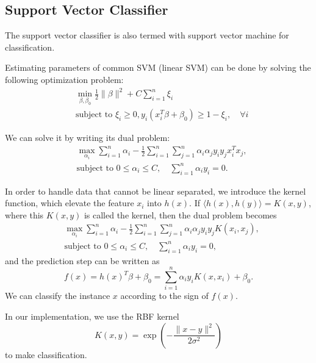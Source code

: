 \documentclass[english]{article}
\begin{document}
\subsection{Support Vector Classifier}
\par The support vector classifier is also termed with support vector machine for classification. 
\par Estimating parameters of common SVM (linear SVM) can be done by solving the following optimization problem:
\begin{equation}
	\begin{aligned}
		& \min_{\beta, \beta_{0}}\frac{1}{2}\|\beta\|^{2} + C\sum_{i=1}^{n}\xi_{i}\\
		& \text{subject to }\xi_{i}\ge 0, y_{i}(x_{i}^{T}\beta + \beta_{0})\ge 1 - \xi_{i}, \quad \forall i
	\end{aligned}
\end{equation}
\par We can solve it by writing its dual problem:
\begin{equation}
	\begin{aligned}
		& \max_{\alpha_{i}}\sum_{i=1}^{n}\alpha_{i} - \frac{1}{2}\sum_{i=1}^{n}\sum_{j=1}^{n}\alpha_{i}\alpha_{j}y_{i}y_{j}x_{i}^{T}x_{j},\\
		& \text{subject to } 0\le \alpha_{i}\le C, \quad\sum_{i=1}^{n}\alpha_{i}y_{i} = 0.
	\end{aligned}
\end{equation}
\par In order to handle data that cannot be linear separated, we introduce the kernel function, which elevate the feature $x_{i}$ into $h(x)$. If $\langle h(x), h(y)\rangle = K(x, y)$, where this $K(x, y)$ is called the kernel, then the dual problem becomes
\begin{equation}
	\begin{aligned}
		& \max_{\alpha_{i}}\sum_{i=1}^{n}\alpha_{i} - \frac{1}{2}\sum_{i=1}^{n}\sum_{j=1}^{n}\alpha_{i}\alpha_{j}y_{i}y_{j}K(x_{i}, x_{j}),\\
		& \text{subject to } 0\le \alpha_{i}\le C, \quad\sum_{i=1}^{n}\alpha_{i}y_{i} = 0,
	\end{aligned}
\end{equation}
and the prediction step can be written as
\begin{equation}
	f(x) = h(x)^{T}\beta + \beta_{0} = \sum_{i=1}^{n}\alpha_{i}y_{i}K(x, x_{i}) + \beta_{0}.
\end{equation}
We can classify the instance $x$ according to the sign of $f(x)$.
\par In our implementation, we use the RBF kernel 
\begin{equation}
	K(x, y) = \exp\left(-\frac{\|x-y\|^{2}}{2\sigma^{2}}\right)
\end{equation}
to make classification.
\end{document}
